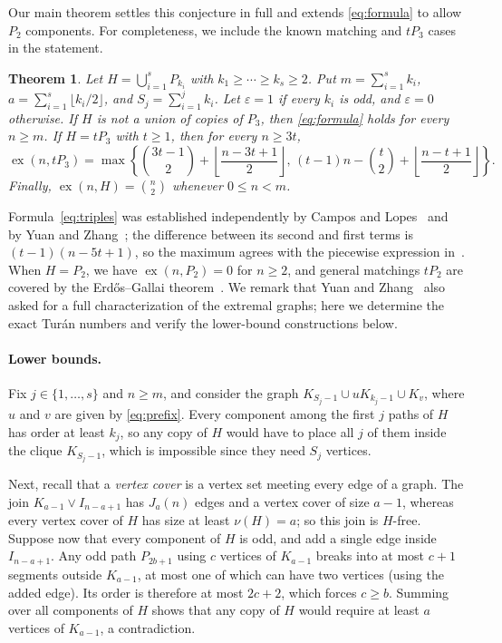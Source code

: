 \documentclass[10pt]{article}
\theoremstyle{compactplain}
\newtheorem{theorem}{Theorem}[section]
\theoremstyle{remark}\newtheorem{remark}[theorem]{Remark}
\newcommand{\ex}{\operatorname{ex}}
\begin{document}
Our main theorem settles this conjecture in full and extends
\eqref{eq:formula} to allow $P_2$ components. For completeness, we
include the known matching and $tP_3$ cases in the statement.

\begin{theorem}\label{thm:main}
Let $H=\bigcup_{i=1}^s P_{k_i}$ with $k_1\ge\cdots\ge k_s\ge2$. Put
$m=\sum_{i=1}^s k_i$, $a=\sum_{i=1}^s\lfloor k_i/2\rfloor$, and
$S_j=\sum_{i=1}^j k_i$. Let $\varepsilon=1$ if every $k_i$ is odd, and
$\varepsilon=0$ otherwise. If $H$ is not a union of copies of $P_3$, then
\eqref{eq:formula} holds for every $n\ge m$. If $H=tP_3$ with $t\ge1$,
then for every $n\ge3t$,
\begin{equation}\label{eq:triples}
 \ex(n,tP_3)=\max\left\{
 \binom{3t-1}{2}+\left\lfloor\frac{n-3t+1}{2}\right\rfloor,\,
 (t-1)n-\binom{t}{2}+\left\lfloor\frac{n-t+1}{2}\right\rfloor
 \right\}.
\end{equation}
Finally, $\ex(n,H)=\binom{n}{2}$ whenever $0\le n<m$.
\end{theorem}

Formula~\eqref{eq:triples} was established independently by Campos and
Lopes~\cite{CL} and by Yuan and Zhang~\cite[Theorem~1.6]{YZtriples}; the
difference between its second and first terms is $(t-1)(n-5t+1)$, so the
maximum agrees with the piecewise expression in~\cite{YZtriples}. When
$H=P_2$, we have $\ex(n,P_2)=0$ for $n\ge2$, and general matchings
$tP_2$ are covered by the Erd\H{o}s--Gallai theorem~\cite{EG}. We remark
that Yuan and Zhang~\cite{YZ} also asked for a full characterization of
the extremal graphs; here we determine the exact Tur\'an numbers and
verify the lower-bound constructions below.

\paragraph{Lower bounds.}
Fix $j\in\{1,\ldots,s\}$ and $n\ge m$, and consider the graph
$K_{S_j-1}\cup uK_{k_j-1}\cup K_v$, where $u$ and $v$ are given by
\eqref{eq:prefix}. Every component among the first $j$ paths of $H$ has
order at least $k_j$, so any copy of $H$ would have to place all $j$ of
them inside the clique $K_{S_j-1}$, which is impossible since they need
$S_j$ vertices.

Next, recall that a \emph{vertex cover} is a vertex set meeting every
edge of a graph. The join $K_{a-1}\vee I_{n-a+1}$ has $J_a(n)$ edges and
a vertex cover of size $a-1$, whereas every vertex cover of $H$ has size
at least $\nu(H)=a$; so this join is $H$-free. Suppose now that every
component of $H$ is odd, and add a single edge inside $I_{n-a+1}$. Any
odd path $P_{2b+1}$ using $c$ vertices of $K_{a-1}$ breaks into at most
$c+1$ segments outside $K_{a-1}$, at most one of which can have two
vertices (using the added edge). Its order is therefore at most $2c+2$,
which forces $c\ge b$. Summing over all components of $H$ shows that any
copy of $H$ would require at least $a$ vertices of $K_{a-1}$, a
contradiction.
\end{document}
